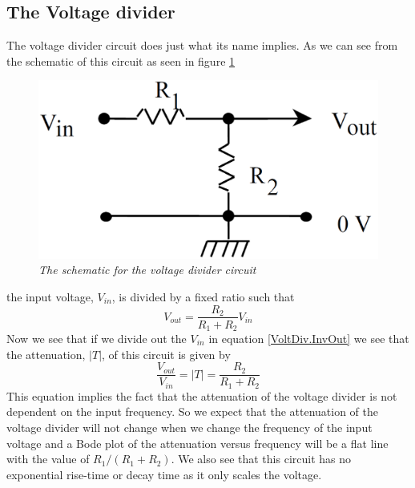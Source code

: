 \documentclass[11pt]{article}
\numberwithin{equation}{section}
\numberwithin{figure}{section}
\numberwithin{table}{section}
\begin{document}
\subsection{The Voltage divider}
The voltage divider circuit does just what its name implies. As we can see from the schematic of this circuit as seen in figure \ref{FigVoltDiv}
\begin{figure}[h]
\centering
\includegraphics[scale=0.20]{Volt.Div.eps}
\caption{\textit{The schematic for the voltage divider circuit}}
\label{FigVoltDiv}
\end{figure}
the input voltage, $V_{in}$, is divided by a fixed ratio such that
\begin{equation}
V_{out} = \frac{R_2}{R_1+R_2}V_{in}
\label{VoltDiv.InvOut}
\end{equation}
Now we see that if we divide out the $V_{in}$ in equation \ref{VoltDiv.InvOut} we see that the attenuation, $|T|$, of this circuit is given by
$$\frac{V_{out}}{V_{in}} = |T| = \frac{R_2}{R_1+R_2}$$
This equation implies the fact that the attenuation of the voltage divider is not dependent on the input frequency. So we expect that the attenuation of the voltage divider will not change when we change the frequency of the input voltage and a Bode plot of the attenuation versus frequency will be a flat line with the value of $R_1/(R_1+R_2)$. We also see that this circuit has no exponential rise-time or decay time as it only scales the voltage. 
\end{document}
